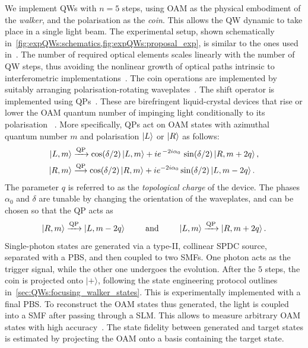 We implement \acp{QW} with $n=5$ steps, using \ac{OAM} as the physical embodiment of the \emph{walker}, and the polarisation as the \emph{coin}. This allows the QW dynamic to take place in a single light beam.
The experimental setup, shown schematically in~\cref{fig:expQWs:schematics,fig:expQWs:proposal_exp}, is similar to the ones used in~\cite{cardano2015quantum,cardano2016statistical}.
The number of required optical elements scales linearly with the number of QW steps, thus avoiding the nonlinear growth of optical paths intrinsic to interferometric implementations~\cite{zhang2010implementation,goyal2013implementing}.
The coin operations are implemented by suitably arranging polarisation-rotating waveplates~\cite{simon1990minimal}. The shift operator is implemented using \acp{QP}~\cite{marrucci2006optical}. These are birefringent liquid-crystal devices that rise or lower the \ac{OAM} quantum number of impinging light conditionally to its polarisation ~\cite{marrucci2006optical}. More specifically, \acp{QP} act on \ac{OAM} states with azimuthal quantum number $m$ and polarisation $\ket L$ or $\ket R$ as follows:
\begin{equation}
\begin{aligned}
	\ket{L,m} & \xrightarrow{\text{QP}} \cos(\delta/2) \ket{L,m}
				+ i e^{\,-2 i \alpha_0}\, \sin(\delta/2) \ket{R,m+2q}, \\
	\ket{R,m} & \stackrel{\text{QP}}{\longrightarrow} \cos(\delta/2) \ket{R,m}
				+ i e^{-2 i \alpha_0} \sin(\delta/2) \ket{L,m-2q}.
\end{aligned}
\end{equation}
The parameter $q$ is referred to as the \emph{topological charge} of the device.
The phases $\alpha_0$ and $\delta$ are tunable by changing the orientation of the waveplates, and can be chosen so that the QP acts as
\begin{equation}
	\ket{R,m}\xrightarrow{\text{QP}} \ket{L,m-2q}
	\qquad\text{ and }\qquad
	\ket{L,m}\xrightarrow{\text{QP}}\ket{R,m+2q}.
\end{equation}
Single-photon states are generated via a type-II, collinear \ac{SPDC} source, separated with a \ac{PBS}, and then coupled to two \acp{SMF}. One photon acts as the trigger signal, while the other one undergoes the evolution.
After the $5$ steps, the coin is projected onto $|+\rangle$, following the state engineering protocol outlines in~\cref{sec:QWs:focusing_walker_states}. This is experimentally implemented with a final \ac{PBS}.
To reconstruct the \ac{OAM} states thus generated, the light is coupled into a \ac{SMF} after passing through a \ac{SLM}. This allows to measure arbitrary \ac{OAM} states with high accuracy~\cite{bolduc2013exact,dambrosio2013test}.
The state fidelity between generated and target states is estimated by projecting the \ac{OAM} onto a basis containing the target state.

